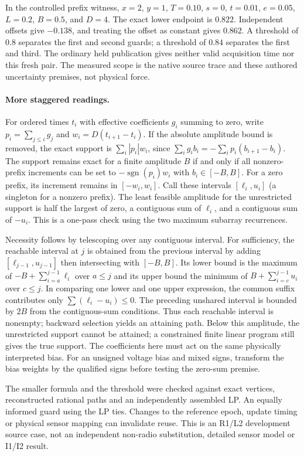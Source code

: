 \documentclass{article}
\begin{document}
In the controlled prefix witness, $x=2$, $y=1$, $T=0.10$,
$s=0$, $t=0.01$, $e=0.05$, $L=0.2$, $B=0.5$, and $D=4$.
The exact lower endpoint is $0.822$. Independent offsets give
$-0.138$, and treating the offset as constant gives $0.862$.
A threshold of $0.8$ separates the first and second guards;
a threshold of $0.84$ separates the first and third. The ordinary
held publication gives neither valid acquisition time nor this
fresh pair. The measured scope is the native source trace and
these authored uncertainty premises, not physical force.

\paragraph{More staggered readings.}
For ordered times $t_i$ with effective coefficients $g_i$ summing
to zero, write $p_i=\sum_{j\le i}g_j$ and
$w_i=D(t_{i+1}-t_i)$. If the absolute amplitude bound is removed,
the exact support is $\sum_i |p_i|w_i$, since
$\sum_i g_ib_i=-\sum_i p_i(b_{i+1}-b_i)$.
The support remains exact for a finite amplitude $B$ if and only if
all nonzero-prefix increments can be set to
$-\operatorname{sgn}(p_i)w_i$ with $b_i\in[-B,B]$. For a zero
prefix, its increment remains in $[-w_i,w_i]$. Call these
intervals $[\ell_i,u_i]$ (a singleton for a nonzero prefix).
The least feasible amplitude for the unrestricted support is half
the largest of zero, a contiguous sum of $\ell_i$, and a contiguous
sum of $-u_i$. This is a one-pass check using the two maximum
subarray recurrences.

Necessity follows by telescoping over any contiguous interval.
For sufficiency, the reachable interval at $j$ is obtained from
the previous interval by adding $[\ell_{j-1},u_{j-1}]$ then
intersecting with $[-B,B]$. Its lower bound is the maximum of
$-B+\sum_{i=a}^{j-1}\ell_i$ over $a\le j$ and its upper bound
the minimum of $B+\sum_{i=c}^{j-1}u_i$ over $c\le j$. In comparing
one lower and one upper expression, the common suffix contributes
only $\sum(\ell_i-u_i)\le0$. The preceding unshared interval is
bounded by $2B$ from the contiguous-sum conditions. Thus each
reachable interval is nonempty; backward selection yields an
attaining path. Below this amplitude, the unrestricted support
cannot be attained; a constrained finite linear program still
gives the true support. The coefficients here must act on the
same physically interpreted bias. For an unsigned voltage bias
and mixed signs, transform the bias weights by the qualified
signs before testing the zero-sum premise.

The smaller formula and the threshold were checked against exact
vertices, reconstructed rational paths and an independently
assembled LP. An equally informed guard using the LP ties.
Changes to the reference epoch, update timing or physical sensor
mapping can invalidate reuse. This is an R1/L2 development source
case, not an independent non-radio substitution, detailed sensor
model or I1/I2 result.
\end{document}
